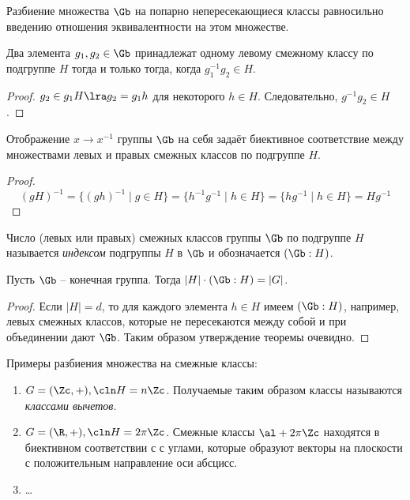 Разбиение множества $\Gb$ на попарно непересекающиеся классы равносильно введению отношения эквивалентности на этом множестве.

\begin{theorem}
  Два элемента $g_1,g_2\in\Gb$ принадлежат одному левому смежному классу по подгруппе $H$ тогда и только тогда, когда $g_1^{-1}g_2\in H$.
\end{theorem}
\begin{proof}
  $g_2\in g_1H \lra g_2=g_1h$ для некоторого $h\in H$. Следовательно, $g^{-1}g_2\in H$.
\end{proof}

\begin{theorem}
  Отображение $x\to x^{-1}$ группы $\Gb$ на себя задаёт биективное соответствие между множествами левых и правых смежных классов по подгруппе $H$.
\end{theorem}
\begin{proof}
  $$(gH)^{-1}=\{(gh)^{-1}\mid g\in H\} = \{h^{-1}g^{-1}\mid h\in H\}=\{hg^{-1}\mid h\in H\}=Hg^{-1}$$
\end{proof}

\begin{df}
  Число (левых или правых) смежных классов группы $\Gb$ по подгруппе $H$ называется \emph{индексом} подгруппы $H$ в $\Gb$ и обозначается $(\Gb:H)$.
\end{df}

\begin{theorem}[Лагранжа]
  Пусть $\Gb$ -- конечная группа. Тогда $|H|\cdot (\Gb:H)=|G|$.
\end{theorem}
\begin{proof}
  Если $|H|=d$, то для каждого элемента $h\in H$ имеем $(\Gb:H)$, например, левых смежных классов, которые не пересекаются между собой и при объединении дают $\Gb$. Таким образом утверждение теоремы очевидно.
\end{proof}

Примеры разбиения множества на смежные классы:
\begin{enumerate}
  \item $G=(\Zc,+),\cln H=n\Zc$. Получаемые таким образом классы называются \emph{классами вычетов}.
  \item $G=(\R,+),\cln H=2\pi\Zc$. Смежные классы $\al+2\pi\Zc$ находятся в биективном соответствии с с углами, которые образуют векторы на плоскости с положительным направление оси абсцисс.
  \item \dots
\end{enumerate}
